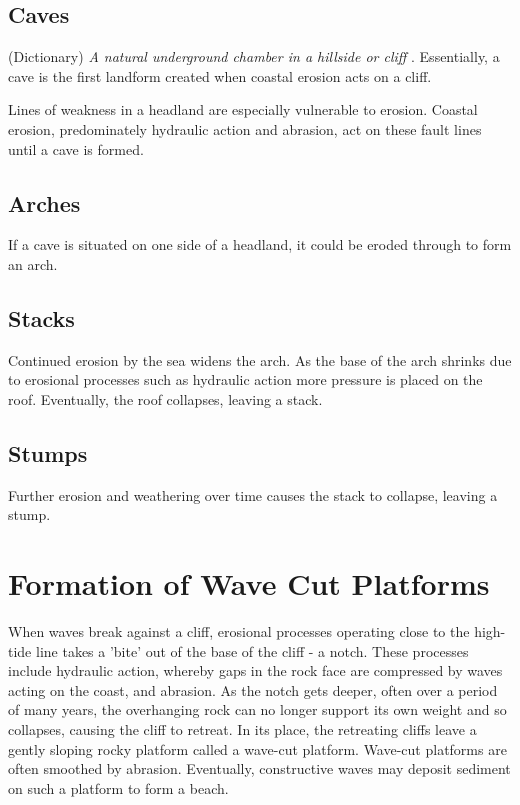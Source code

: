 \documentclass[11pt]{article}
\begin{document}
\subsection{Caves}
\label{sec:orgd6c112a}
(Dictionary) \emph{A natural underground chamber in a hillside or cliff} . Essentially, a cave is the first landform created when coastal erosion acts on a cliff.   

Lines of weakness in a headland are especially vulnerable to erosion. Coastal erosion, predominately hydraulic action and abrasion, act on these fault lines until a cave is formed.

\subsection{Arches}
\label{sec:orgbdb2cff}
If a cave is situated on one side of a headland, it could be eroded through to form an arch.

\subsection{Stacks}
\label{sec:org7b90546}
Continued erosion by  the sea widens the arch. As the base of the arch shrinks due to erosional processes such as hydraulic action more pressure is placed on the roof. Eventually, the roof collapses, leaving a stack.

\subsection{Stumps}
\label{sec:org6ceae8a}
Further erosion and weathering over time causes the stack to collapse, leaving a stump.

\section{Formation of Wave Cut Platforms}
\label{sec:org8c81b46}

When waves break against a cliff, erosional processes operating close to the high-tide line takes a 'bite' out of the base of the cliff - a notch. These processes include hydraulic action, whereby gaps in the rock face are compressed by waves acting on the coast, and abrasion.  As the notch gets deeper, often over a period of many years, the overhanging rock can no longer support its own weight and so collapses, causing the cliff to retreat. In its place, the retreating cliffs leave a gently sloping rocky platform called a wave-cut platform. Wave-cut platforms are often smoothed by abrasion. Eventually, constructive waves may deposit sediment on such a platform to form a beach.
\end{document}
